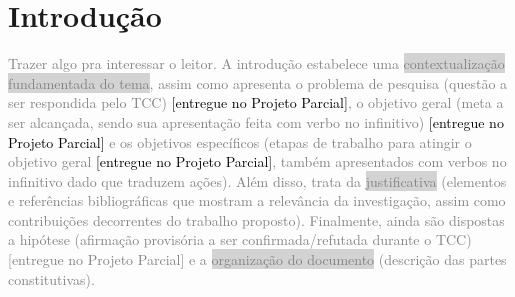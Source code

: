 
\section{Introdução}

\textcolor{gray}{Trazer algo pra interessar o leitor. A introdução estabelece uma \colorbox{lightgray}{contextualização fundamentada do tema}, assim como apresenta o problema de pesquisa (questão a ser respondida pelo TCC) \textcolor{black}{[entregue no Projeto Parcial]}, o objetivo geral (meta a ser alcançada, sendo sua apresentação feita com verbo no infinitivo) \textcolor{black}{[entregue no Projeto Parcial]} e os objetivos específicos (etapas de trabalho para atingir o objetivo geral \textcolor{black}{[entregue no Projeto Parcial]}, também apresentados com verbos no infinitivo dado que traduzem ações). Além disso, trata da \colorbox{lightgray}{justificativa} (elementos e referências bibliográficas que mostram a relevância da investigação, assim como contribuições decorrentes do trabalho proposto).}
\textcolor{gray}{Finalmente, ainda são dispostas a hipótese (afirmação provisória a ser confirmada/refutada durante o TCC) [entregue no Projeto Parcial] e a \colorbox{lightgray}{organização do documento} (descrição das partes constitutivas).}